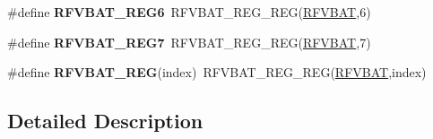 \begin{DoxyCompactItemize}
\item 
\#define {\bfseries R\+F\+V\+B\+A\+T\+\_\+\+R\+E\+G6}~R\+F\+V\+B\+A\+T\+\_\+\+R\+E\+G\+\_\+\+R\+EG(\hyperlink{group__RFVBAT__Peripheral__Access__Layer_gac2c2895b56604565c1deab90aedbf1a4}{R\+F\+V\+B\+AT},6)\hypertarget{group__RFVBAT__Register__Accessor__Macros_ga8f932612a87a5a7e302b4990c3880b03}{}\label{group__RFVBAT__Register__Accessor__Macros_ga8f932612a87a5a7e302b4990c3880b03}

\item 
\#define {\bfseries R\+F\+V\+B\+A\+T\+\_\+\+R\+E\+G7}~R\+F\+V\+B\+A\+T\+\_\+\+R\+E\+G\+\_\+\+R\+EG(\hyperlink{group__RFVBAT__Peripheral__Access__Layer_gac2c2895b56604565c1deab90aedbf1a4}{R\+F\+V\+B\+AT},7)\hypertarget{group__RFVBAT__Register__Accessor__Macros_gadfbd3389e8e352e6fa869c5637131038}{}\label{group__RFVBAT__Register__Accessor__Macros_gadfbd3389e8e352e6fa869c5637131038}

\item 
\#define {\bfseries R\+F\+V\+B\+A\+T\+\_\+\+R\+EG}(index)~R\+F\+V\+B\+A\+T\+\_\+\+R\+E\+G\+\_\+\+R\+EG(\hyperlink{group__RFVBAT__Peripheral__Access__Layer_gac2c2895b56604565c1deab90aedbf1a4}{R\+F\+V\+B\+AT},index)\hypertarget{group__RFVBAT__Register__Accessor__Macros_ga20dd741a9b666fc831ddf60fdb30e7d9}{}\label{group__RFVBAT__Register__Accessor__Macros_ga20dd741a9b666fc831ddf60fdb30e7d9}

\end{DoxyCompactItemize}


\subsection{Detailed Description}

